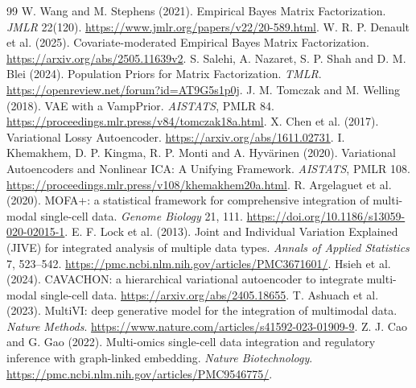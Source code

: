 \documentclass[11pt,a4paper]{article}
\begin{document}
\begin{thebibliography}{99}\small
{} W. Wang and M. Stephens (2021). Empirical Bayes Matrix
Factorization. \emph{JMLR} 22(120). \url{https://www.jmlr.org/papers/v22/20-589.html}.
 W. R. P. Denault et al. (2025). Covariate-moderated Empirical
Bayes Matrix Factorization. \url{https://arxiv.org/abs/2505.11639v2}.
 S. Salehi, A. Nazaret, S. P. Shah and D. M. Blei (2024).
Population Priors for Matrix Factorization. \emph{TMLR}.
\url{https://openreview.net/forum?id=AT9G5s1p0j}.
 J. M. Tomczak and M. Welling (2018). VAE with a VampPrior.
\emph{AISTATS}, PMLR 84. \url{https://proceedings.mlr.press/v84/tomczak18a.html}.
 X. Chen et al. (2017). Variational Lossy Autoencoder.
\url{https://arxiv.org/abs/1611.02731}.
 I. Khemakhem, D. P. Kingma, R. P. Monti and A. Hyv\"arinen
(2020). Variational Autoencoders and Nonlinear ICA: A Unifying Framework.
\emph{AISTATS}, PMLR 108. \url{https://proceedings.mlr.press/v108/khemakhem20a.html}.
 R. Argelaguet et al. (2020). MOFA+: a statistical framework for
comprehensive integration of multi-modal single-cell data.
\emph{Genome Biology} 21, 111. \url{https://doi.org/10.1186/s13059-020-02015-1}.
 E. F. Lock et al. (2013). Joint and Individual Variation
Explained (JIVE) for integrated analysis of multiple data types.
\emph{Annals of Applied Statistics} 7, 523--542.
\url{https://pmc.ncbi.nlm.nih.gov/articles/PMC3671601/}.
 Hsieh et al. (2024). CAVACHON: a hierarchical variational
autoencoder to integrate multi-modal single-cell data.
\url{https://arxiv.org/abs/2405.18655}.
 T. Ashuach et al. (2023). MultiVI: deep generative model
for the integration of multimodal data. \emph{Nature Methods}.
\url{https://www.nature.com/articles/s41592-023-01909-9}.
 Z. J. Cao and G. Gao (2022). Multi-omics single-cell data
integration and regulatory inference with graph-linked embedding.
\emph{Nature Biotechnology}.
\url{https://pmc.ncbi.nlm.nih.gov/articles/PMC9546775/}.
\end{thebibliography}
\end{document}
